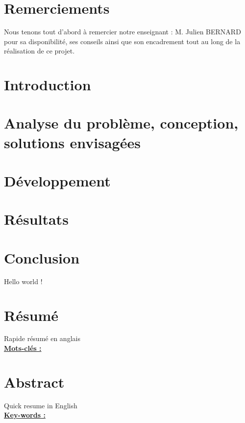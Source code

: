 \documentclass[french, a4paper, 10pt]{article}
\begin{document}
 
\maketitle       %
\thispagestyle{firstpage} %
\newpage %

\section*{Remerciements}
Nous tenons tout d'abord à remercier notre enseignant : M. Julien BERNARD pour sa disponibilité, ses conseils ainsi que son encadrement tout au long de la réalisation de ce projet.

\tableofcontents

\newpage
\section{Introduction}
\newpage
\section{Analyse du problème, conception, solutions envisagées}
\newpage
\section{Développement}
\newpage
\section{Résultats}
\newpage
\section{Conclusion}
Hello world !
\newpage
\section*{Résumé}
Rapide résumé en anglais \\
\underline{\textbf{Mots-clés :}}
\section*{Abstract}
Quick resume in English \\
\underline{\textbf{Key-words :}}
\end{document}
